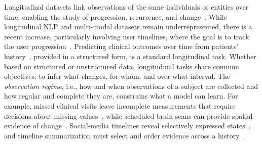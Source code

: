 \documentclass[11pt]{article}
\theoremstyle{plain}
\theoremstyle{definition}
\theoremstyle{remark}
\begin{document}
Longitudinal datasets link observations of the same individuals or entities over time, enabling the study of progression, recurrence, and change~\cite{diggle2024longitudinal}. While longitudinal NLP and multi-modal datasets remain underrepresented, there is a recent increase, particularly involving user timelines, where the goal is to track the user progression~\cite{tsakalidis-etal-2022-overview}. Predicting clinical outcomes over time from patients' history~\cite{rajkomar2018scalable}, provided in a structured form, is a standard longitudinal task. %
Whether based on structured or unstructured data, longitudinal tasks share common objectives: to infer what changes, for whom, and over what interval. The \emph{observation regime}, i.e., how and when observations of a subject are collected and how regular and complete they are, constrains what a model can learn. For example, missed clinical visits leave incomplete measurements that require decisions about missing values~\cite{8904478}, while scheduled brain scans can provide spatial evidence of change~\cite{10483639}. Social-media timelines reveal selectively expressed states~\cite{coppersmith-etal-2016-exploratory}, and timeline summarization must select and order evidence across a history~\cite{wu-etal-2025-unfolding,song-etal-2025-temporal}. 
\end{document}

